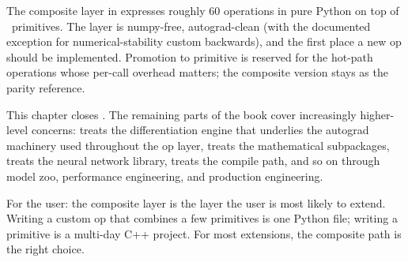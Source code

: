 The composite layer in  expresses
roughly 60 operations in pure Python on top of \Lucid\ primitives.
The layer is numpy-free, autograd-clean (with the documented
exception for numerical-stability custom backwards), and the first
place a new op should be implemented. Promotion to primitive is
reserved for the hot-path operations whose per-call overhead
matters; the composite version stays as the parity reference.

This chapter closes . The remaining
parts of the book cover increasingly higher-level concerns:
 treats the differentiation engine that
underlies the autograd machinery used throughout the op layer,
 treats the mathematical
subpackages,  treats the neural
network library,  treats the compile
path, and so on through model zoo, performance engineering, and
production engineering.

\begin{lucidnote}
For the user: the composite layer is the layer the user is most
likely to extend. Writing a custom op that combines a few
primitives is one Python file; writing a primitive is a multi-day
C++ project. For most extensions, the composite path is the
right choice.
\end{lucidnote}
